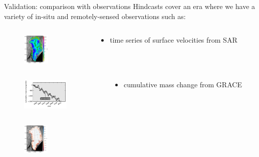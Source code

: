 \documentclass[hide notes,intlimits]{beamer}
\begin{document}
\begin{frame}{Validation: comparison with observations}
  Hindcasts cover an era where we have a variety of in-situ and remotely-sensed observations such as:
  \begin{columns}[c]
    \begin{column}{.4\linewidth}
    \begin{figure}
      \includegraphics[height=1.5cm]{sar-validation}
    \end{figure}
  \end{column}
    \begin{column}{.6\linewidth}
      \begin{itemize}
      \item time series of surface velocities from SAR
  \end{itemize}
\end{column}
 \end{columns}   
  \vspace{-.5em}
  \begin{columns}[c]
    \begin{column}{.4\linewidth}
      \begin{figure}
        \includegraphics[height=1.5cm]{grace-validation} 
      \end{figure}
    \end{column}
    \begin{column}{.6\linewidth}
      \begin{itemize}
      \item cumulative mass change from GRACE
    \end{itemize}
  \end{column}
 \end{columns}   
 \vspace{-1em}
 \begin{columns}[c]
   \begin{column}{.4\linewidth}
     \begin{figure}
       \includegraphics[height=1.5cm]{icesat-validation}

\end{figure}
\end{column}
\end{columns}
\end{frame}
\end{document}
